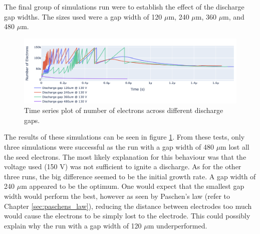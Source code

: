 The final group of simulations run were to establish the effect of the discharge gap widths. The sizes used were a gap width of 120 $\mu$m, 240 $\mu$m, 360 $\mu$m, and 480 $\mu$m. 

\begin{figure}[h!]
	\centering
	\includegraphics[width=\linewidth]{chapter_4/figures/num_elec_gap.png}
	\caption{Time series plot of number of electrons across different discharge gaps.}
	\label{fig:num_elec_gap}
\end{figure}

The results of these simulations can be seen in figure \ref{fig:num_elec_gap}. From these tests, only three simulations were successful as the run with a gap width of 480 $\mu$m lost all the seed electrons. The most likely explanation for this behaviour was that the voltage used (150 V) was not sufficient to ignite a discharge. As for the other three runs, the big difference seemed to be the initial growth rate. A gap width of 240 $\mu$m appeared to be the optimum. One would expect that the smallest gap width would perform the best, however as seen by Paschen's law (refer to Chapter \ref{sec:paschens_law}), reducing the distance between electrodes too much would cause the electrons to be simply lost to the electrode. This could possibly explain why the run with a gap width of 120 $\mu$m underperformed.

